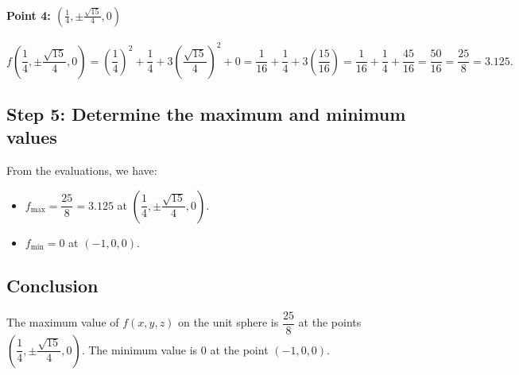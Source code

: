 \documentclass[11pt]{article}
\begin{document}
\paragraph{Point 4: \( \left( \frac{1}{4}, \pm \frac{\sqrt{15}}{4}, 0 \right) \)}

\[
f\left( \frac{1}{4}, \pm \frac{\sqrt{15}}{4}, 0 \right) = \left( \frac{1}{4} \right)^2 + \frac{1}{4} + 3 \left( \frac{\sqrt{15}}{4} \right)^2 + 0 = \frac{1}{16} + \frac{1}{4} + 3 \left( \frac{15}{16} \right) = \frac{1}{16} + \frac{1}{4} + \frac{45}{16} = \frac{50}{16} = \frac{25}{8} = 3.125.
\]

\newpage

\subsection{Step 5: Determine the maximum and minimum values}

From the evaluations, we have:

\begin{itemize}
    \item \( f_{\text{max}} = \dfrac{25}{8} = 3.125 \) at \( \left( \dfrac{1}{4}, \pm \dfrac{\sqrt{15}}{4}, 0 \right) \).
    \item \( f_{\text{min}} = 0 \) at \( (-1, 0, 0) \).
\end{itemize}

\newpage

\subsection{Conclusion}

The maximum value of \( f(x, y, z) \) on the unit sphere is \( \dfrac{25}{8} \) at the points \( \left( \dfrac{1}{4}, \pm \dfrac{\sqrt{15}}{4}, 0 \right) \). The minimum value is \( 0 \) at the point \( (-1, 0, 0) \).
\end{document}
